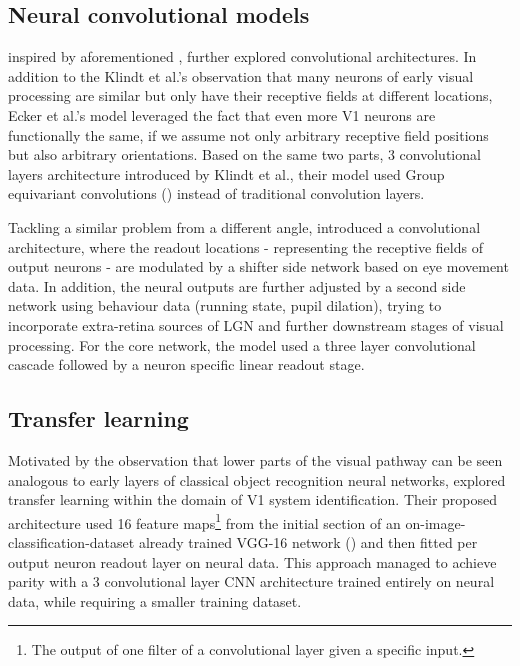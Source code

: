 \subsection{Neural convolutional models}
\cite{ecker} inspired by aforementioned \cite{klindt}, further explored convolutional architectures. In addition to the Klindt et al.’s observation that many neurons of early visual processing are similar but only have their receptive fields at different locations, Ecker et al.’s model leveraged the fact that even more V1 neurons are functionally the same, if we assume not only arbitrary receptive field positions but also arbitrary orientations. Based on the same two parts, 3 convolutional layers architecture introduced by Klindt et al., their model used Group equivariant convolutions (\cite{2016arXiv160207576C}) instead of traditional convolution layers.

Tackling a similar problem from a different angle, \cite{Walke506956} introduced a convolutional architecture, where the readout locations - representing the receptive fields of output neurons - are modulated by a shifter side network based on eye movement data. In addition, the neural outputs are further adjusted by a second side network using behaviour data (running state, pupil dilation), trying to incorporate extra-retina sources of LGN and further downstream stages of visual processing. For the core network, the model used a three layer convolutional cascade followed by a neuron specific linear readout stage. 

\subsection{Transfer learning}

Motivated by the observation that lower parts of the visual pathway can be seen analogous to early layers of classical object recognition neural networks, \cite{10.1371/journal.pcbi.1006897} explored transfer learning within the domain of V1 system identification. Their proposed architecture used 16 feature maps\footnote{The output of one filter of a convolutional layer given a specific input.} from the initial section of an on-image-classification-dataset already trained VGG-16 network (\cite{VGG16}) and then fitted per output neuron readout layer on neural data. This approach managed to achieve parity with a 3 convolutional layer CNN architecture trained entirely on neural data, while requiring a smaller training dataset.
